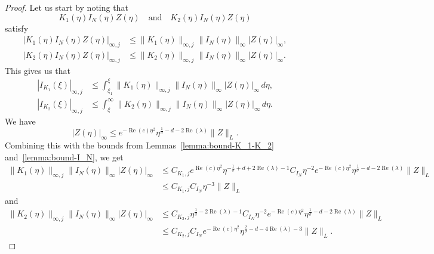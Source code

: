 \documentclass[11pt]{article}
\DeclareMathOperator{\real}{Re}
\begin{document}
\begin{proof}
  Let us start by noting that
  \begin{equation*}
    K_{1}(\eta)I_{N}(\eta)Z(\eta) \quad\text{and}\quad
    K_{2}(\eta)I_{N}(\eta)Z(\eta)
  \end{equation*}
  satisfy
  \begin{align*}
    |K_{1}(\eta)I_{N}(\eta)Z(\eta)|_{\infty,j} &\leq \|K_{1}(\eta)\|_{\infty,j}\|I_{N}(\eta)\|_{\infty}|Z(\eta)|_{\infty},\\
    |K_{2}(\eta)I_{N}(\eta)Z(\eta)|_{\infty,j} &\leq \|K_{2}(\eta)\|_{\infty,j}\|I_{N}(\eta)\|_{\infty}|Z(\eta)|_{\infty}.
  \end{align*}
  This gives us that
  \begin{align*}
    |I_{K_{1}}(\xi)|_{\infty,j}
    &\leq \int_{\xi_{1}}^{\xi} \|K_{1}(\eta)\|_{\infty,j}\|I_{N}(\eta)\|_{\infty}|Z(\eta)|_{\infty}\,d\eta,\\
    |I_{K_{2}}(\xi)|_{\infty,j}
    &\leq \int_{\xi}^{\infty} \|K_{2}(\eta)\|_{\infty,j}\|I_{N}(\eta)\|_{\infty}|Z(\eta)|_{\infty}\,d\eta.
  \end{align*}
  We have
  \begin{equation*}
    |Z(\eta)|_{\infty} \leq e^{-\real(c)\eta^{2}}\eta^{\frac{1}{\sigma} - d - 2\real(\lambda)}\|Z\|_{L}.
  \end{equation*}
  Combining this with the bounds from
  Lemmas~\ref{lemma:bound-K_1-K_2} and~\ref{lemma:bound-I_N}, we get
  \begin{equation*}
    \begin{split}
      \|K_{1}(\eta)\|_{\infty,j}\|I_{N}(\eta)\|_{\infty}|Z(\eta)|_{\infty}
      &\leq C_{K_{1},j}e^{\real(c)\eta^{2}}\eta^{-\frac{1}{\sigma} + d + 2\real(\lambda) - 1}
      C_{I_{N}}\eta^{-2}
      e^{-\real(c)\eta^{2}}\eta^{\frac{1}{\sigma} - d - 2\real(\lambda)}\|Z\|_{L}\\
      &\leq C_{K_{1},j}C_{I_{N}}\eta^{-3}\|Z\|_{L}
    \end{split}
  \end{equation*}
  and
  \begin{equation*}
    \begin{split}
      \|K_{2}(\eta)\|_{\infty,j}\|I_{N}(\eta)\|_{\infty}|Z(\eta)|_{\infty}
      &\leq C_{K_{2},j}\eta^{\frac{1}{\sigma} - 2\real(\lambda) - 1}
      C_{I_{N}}\eta^{-2}
      e^{-\real(c)\eta^{2}}\eta^{\frac{1}{\sigma} - d - 2\real(\lambda)}\|Z\|_{L}\\
      &\leq C_{K_{2},j}C_{I_{N}}e^{-\real(c)\eta^{2}}\eta^{\frac{2}{\sigma} - d - 4\real(\lambda) - 3}\|Z\|_{L}.

\end{split}
\end{equation*}
\end{proof}
\end{document}

